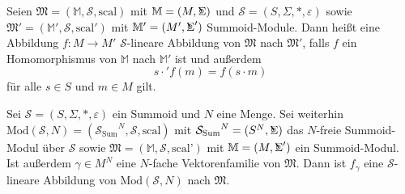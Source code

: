 \documentclass{article}
\DeclareMathOperator*{\Sigmacirc}{%
  \ThisStyle{\mathop{\ensurestackMath{\stackinset{c}{-0.75\LMpt}{c}{}{%
  \rotatebox[origin=lb]{-90}{$\circ$}}{\SavedStyle\Sigma}}}}}
\begin{document}
\begin{definition}
  Seien $\mathfrak{M} = (\mathbb{M}, \mathcal{S}, \text{scal})$
  mit $\mathbb{M} = (M, \Sigmacirc)$
  und $\mathcal{S} = (S, \Sigma, \ast, \varepsilon)$
  sowie $\mathfrak{M}' = (\mathbb{M}', \mathcal{S}, \text{scal}')$
  mit $\mathbb{M}' = (M', \Sigmacirc')$ Summoid-Module.
  Dann heißt eine Abbildung $f \colon M \to M'$ 
  $\mathcal{S}$-lineare Abbildung von $\mathfrak{M}$ nach $\mathfrak{M}'$, 
  falls $f$ ein Homomorphismus von $\mathbb{M}$ nach $\mathbb{M}'$ ist und außerdem
  \begin{equation*}
    s \cdot' f(m) = f(s \cdot m)
  \end{equation*}
  für alle $s \in S$ und $m \in M$ gilt.
\end{definition}

\begin{theorem}\label{Theorem_FGammaSLinear}
  Sei $\mathcal{S} = (S, \Sigma, \ast, \varepsilon)$ ein Summoid und $N$ eine Menge.
  Sei weiterhin $\text{Mod}(\mathcal{S}, N) = ({\mathcal{S}_\text{Sum}}^N, \mathcal{S}, \text{scal})$
  mit ${\mathcal{S}_\text{Sum}}^N = (S^N, \Sigmacirc)$ das $N$-freie Summoid-Modul über $\mathcal{S}$
  sowie $\mathfrak{M} = (\mathbb{M}, \mathcal{S}, \text{scal'})$
  mit $\mathbb{M} = (M, \Sigmacirc')$ ein Summoid-Modul.
  Ist außerdem $\gamma \in M^N$ eine $N$-fache Vektorenfamilie von $\mathfrak{M}$.
  Dann ist $f_\gamma$ eine $\mathcal{S}$-lineare Abbildung von $\text{Mod}(\mathcal{S}, N)$ nach $\mathfrak{M}$.
\end{theorem}
\end{document}
